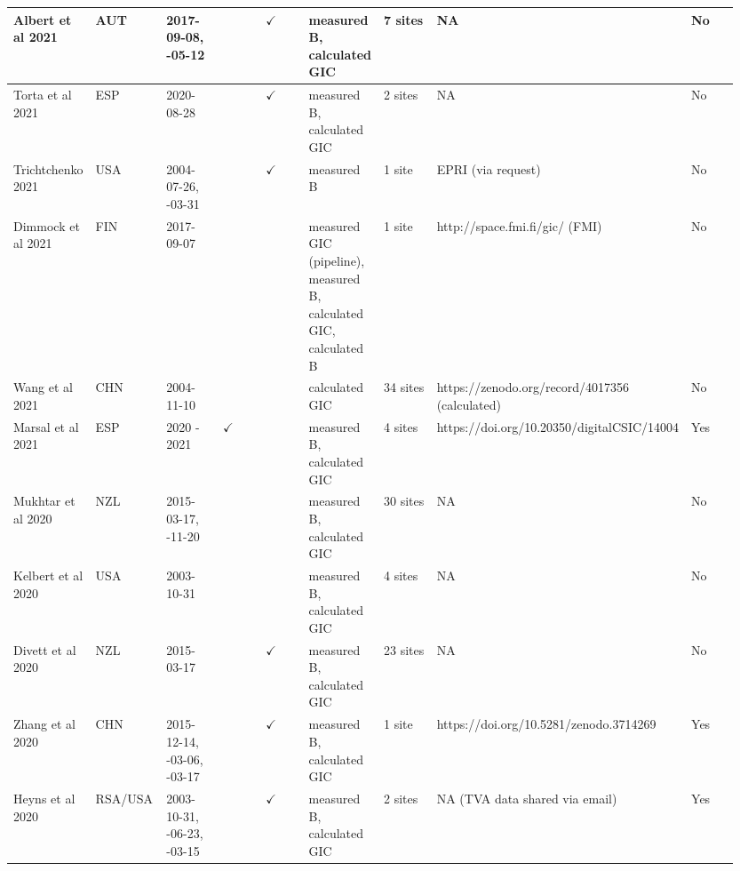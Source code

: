 \begin{longtable}{p{0.106\linewidth}p{0.106\linewidth}p{0.106\linewidth}p{0.106\linewidth}p{0.106\linewidth}p{0.106\linewidth}p{0.106\linewidth}p{0.106\linewidth}p{0.106\linewidth}}
Albert et al 2021 & AUT & 2017-09-08, \newline 2021-05-12 &  & $\checkmark$ & measured B, \newline calculated GIC & 7 sites & NA & No \\ \hline
Torta et al 2021 & ESP & 2020-08-28 &  & $\checkmark$ & measured B, \newline calculated GIC & 2 sites & NA & No \\ \hline
Trichtchenko 2021 & USA & 2004-07-26, \newline 2001-03-31 &  & $\checkmark$ & measured B & 1 site & EPRI (via request) & No \\ \hline
Dimmock et al 2021 & FIN & 2017-09-07 &  &  & measured GIC (pipeline), \newline measured B, \newline calculated GIC, \newline calculated B & 1 site & http://space.fmi.fi/gic/ (FMI) & No \\ \hline
Wang et al 2021 & CHN & 2004-11-10 &  &  & calculated GIC & 34 sites & https://zenodo.org/record/4017356 (calculated) & No \\ \hline
Marsal et al 2021 & ESP & 2020 - 2021 & $\checkmark$ &  & measured B, \newline calculated GIC & 4 sites & https://doi.org/10.20350/digitalCSIC/14004 & Yes \\ \hline
Mukhtar et al 2020 & NZL & 2015-03-17, \newline 2003-11-20 &  &  & measured B, \newline calculated GIC & 30 sites & NA & No \\ \hline
Kelbert et al 2020 & USA & 2003-10-31 &  &  & measured B, \newline calculated GIC & 4 sites & NA & No \\ \hline
Divett et al 2020 & NZL & 2015-03-17 &  & $\checkmark$ & measured B, \newline calculated GIC & 23 sites & NA & No \\ \hline
Zhang et al 2020 & CHN & 2015-12-14, \newline 2016-03-06, \newline 2015-03-17 &  & $\checkmark$ & measured B, \newline calculated GIC & 1 site & https://doi.org/10.5281/zenodo.3714269 & Yes \\ \hline
Heyns et al 2020 & RSA/USA & 2003-10-31, \newline 2015-06-23, \newline 1989-03-15 &  & $\checkmark$ & measured B, \newline calculated GIC & 2 sites & NA (TVA data shared via email) & Yes \\ \hline

\end{longtable}
